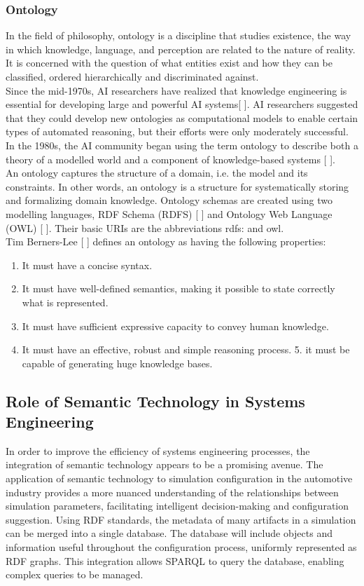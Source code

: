     \subsubsection{Ontology}
    In the field of philosophy, ontology is a discipline that studies existence, the way in which knowledge, language, and perception are related to the nature of reality. It is concerned with the question of what entities exist and how they can be classified, ordered hierarchically and discriminated against. \\
    Since the mid-1970s, AI researchers have realized that knowledge engineering is essential for developing large and powerful AI systems[ ]. AI researchers suggested that they could develop new ontologies as computational models to enable certain types of automated reasoning, but their efforts were only moderately successful. In the 1980s, the AI community began using the term ontology to describe both a theory of a modelled world and a component of knowledge-based systems [ ].\\
    An ontology captures the structure of a domain, i.e. the model and its constraints. In other words, an ontology is a structure for systematically storing and formalizing domain knowledge. Ontology schemas are created using two modelling languages, RDF Schema (RDFS) [ ] and Ontology Web Language (OWL) [ ]. Their basic URIs are the abbreviations rdfs: and owl.\\

    Tim Berners-Lee [ ] defines an ontology as having the following properties: 
    \begin{enumerate}
        \item It must have a concise syntax.
        \item It must have well-defined semantics, making it possible to state correctly what is represented.
        \item It must have sufficient expressive capacity to convey human knowledge.
        \item It must have an effective, robust and simple reasoning process. 5. it must be capable of generating huge knowledge bases.
    \end{enumerate}


\subsection{Role of Semantic Technology in Systems Engineering}
In order to improve the efficiency of systems engineering processes, the integration of semantic technology appears to be a promising avenue. The application of semantic technology to simulation configuration in the automotive industry provides a more nuanced understanding of the relationships between simulation parameters, facilitating intelligent decision-making and configuration suggestion. Using RDF standards, the metadata of many artifacts in a simulation can be merged into a single database. The database will include objects and information useful throughout the configuration process, uniformly represented as RDF graphs. This integration allows SPARQL to query the database, enabling complex queries to be managed.\\

